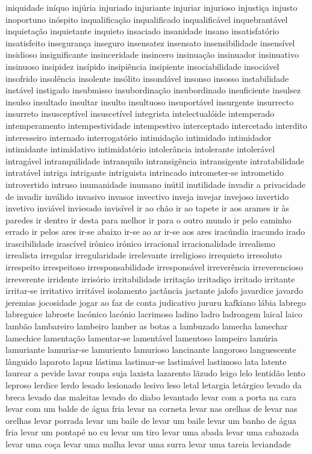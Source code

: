 \begin{appendices}
iniquidade in\'{i}quo inj\'{u}ria injuriado injuriante injuriar injurioso injusti\c{c}a injusto inoportuno in\'{o}spito inqualifica\c{c}\~ao inqualificado inqualific\'{a}vel inquebrant\'{a}vel inquieta\c{c}\~ao inquietante inquieto insaciado insanidade insano insatisfat\'{o}rio insatisfeito inseguran\c{c}a inseguro insensatez insensato insensibilidade insens\'{i}vel insidioso insignificante insinceridade insincero insinua\c{c}\~ao insinuador insinuativo insinuoso insipidez ins\'{i}pido insipi\^{e}ncia insipiente insociabilidade insoci\'{a}vel insofrido insol\^{e}ncia insolente ins\'{o}lito insond\'{a}vel insonso insosso instabilidade inst\'{a}vel instigado insubmisso insubordina\c{c}\~ao insubordinado insuficiente insulsez insulso insultado insultar insulto insultuoso insuport\'{a}vel insurgente insurrecto insurreto insuscept\'{i}vel insuscet\'{i}vel integrista intelectual\'{o}ide intemperado intemperamento intempestividade intempestivo interceptado intercetado interdito interesseiro internado interrogat\'{o}rio intimida\c{c}\~ao intimidado intimidador intimidante intimidativo intimidat\'{o}rio intoler\^{a}ncia intolerante intoler\'{a}vel intrag\'{a}vel intranquilidade intranquilo intransig\^{e}ncia intransigente intratabilidade intrat\'{a}vel intriga intrigante intriguista intrincado intrometer-se intrometido introvertido intruso inumanidade inumano in\'{u}til inutilidade invadir a privacidade de invadir inv\'{a}lido invasivo invasor invectivo inveja invejar invejoso invertido invetivo invi\'{a}vel inviesado invis\'{i}vel ir ao ch\~ao ir ao tapete ir aos arames ir \`{a}s paredes ir dentro ir desta para melhor ir para o outro mundo ir pelo caminho errado ir pelos ares ir-se abaixo ir-se ao ar ir-se aos ares irac\'{u}ndia iracundo irado irascibilidade irasc\'{i}vel ir\^{o}nico ir\'{o}nico irracional irracionalidade irrealismo irrealista irregular irregularidade irrelevante irreligioso irrequieto irresoluto irrespeito irrespeitoso irresponsabilidade irrespons\'{a}vel irrever\^{e}ncia irreverencioso irreverente irridente irris\'{o}rio irritabilidade irrita\c{c}\~ao irritadi\c{c}o irritado irritante irritar-se irritativo irrit\'{a}vel isolamento jact\^{a}ncia jactante jalofo javardice javardo jeremias jocosidade jogar ao faz de conta judicativo jururu kafkiano l\'{a}bia labrego labreguice labroste lac\'{o}nico lac\'{o}nio lacrimoso ladino ladro ladroagem laical laico lamb\~ao lambareiro lambeiro lamber as botas a lambuzado lamecha lamechar lamechice lamenta\c{c}\~ao lamentar-se lament\'{a}vel lamentoso lampeiro lam\'{u}ria lamuriante lamuriar-se lamuriento lamurioso lancinante langoroso languescente l\^{a}nguido laparoto lapuz l\'{a}stima lastimar-se lastim\'{a}vel lastimoso lata latente laurear a pevide lavar roupa suja laxista lazarento l\~azudo leigo lelo lentid\~ao lento leproso lerdice lerdo lesado lesionado lesivo leso letal letargia let\'{a}rgico levado da breca levado das maleitas levado do diabo levantado levar com a porta na cara levar com um balde de \'{a}gua fria levar na corneta levar nas orelhas de levar nas orelhas levar porrada levar um baile de levar um baile levar um banho de \'{a}gua fria levar um pontap\'{e} no cu levar um tiro levar uma abada levar uma cabazada levar uma co\c{c}a levar uma malha levar uma surra levar uma tareia leviandade 
\end{appendices}
